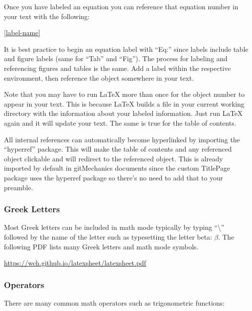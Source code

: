 \begin{center}
\begin{latexcode}
\label{label-name}
\end{latexcode}
\end{center}

Once you have labeled an equation you can reference that equation number in your text with the following:

\begin{center}
\begin{latexcode}
\ref{label-name}
\end{latexcode}
\end{center}

It is best practice to begin an equation label with ``Eq:'' since labels include table and figure labels (same for ``Tab'' and ``Fig''). The process for labeling and referencing figures and tables is the same. Add a label within the respective environment, then reference the object somewhere in your text.

Note that you may have to run \LaTeX{} more than once for the object number to appear in your text. This is because \LaTeX{} builds a file in your current working directory with the information about your labeled information. Just run \LaTeX{} again and it will update your text. The same is true for the table of contents.

All internal references can automatically become hyperlinked by importing the ``hyperref'' package. This will make the table of contents and any referenced object clickable and will redirect to the referenced object. This is already imported by default in gitMechanics documents since the custom TitlePage package uses the hyperref package so there's no need to add that to your preamble.

\subsubsection{Greek Letters}
Most Greek letters can be included in math mode typically by typing ``\textbackslash'' followed by the name of the letter such as typesetting the letter beta: $\beta$. The following PDF lists many Greek letters and math mode symbols.

\begin{center}
	\url{https://wch.github.io/latexsheet/latexsheet.pdf}
\end{center}

\subsubsection{Operators}
There are many common math operators such as trigonometric functions: 

